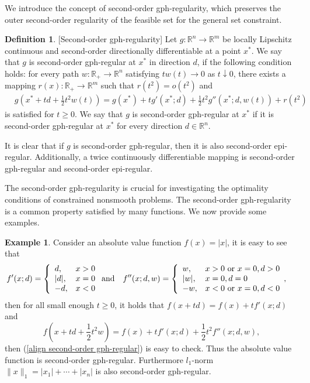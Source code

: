 \documentclass[11pt]{article}
\theoremstyle{definition}
\newtheorem{definition}[theorem]{Definition}
\newtheorem{example}[theorem]{Example}
\theoremstyle{remark}
\numberwithin{equation}{section}
\begin{document}
We introduce the concept of second-order gph-regularity, which preserves the outer second-order regularity of the feasible set for the general set constraint.
\begin{definition}\label{def Second-order gph-regular}[Second-order gph-regularity]
 Let $g:\mathbb{R}^n\to \mathbb{R}^m$ be locally Lipschitz continuous and second-order directionally differentiable at a point $x^*$.
   We say that $g$ is second-order gph-regular at $x^*$ in
  direction $d$, if the following condition holds: for
every path $w:\mathbb{R}_{+}\to \mathbb{R}^n$ satisfying $tw(t)\to 0$ as $t\downarrow 0$, there exists  a mapping $r(x):\mathbb{R}_{+}\to \mathbb{R}^m$ such that
$r(t^2)=o(t^2)$ and
\begin{align}\label{align second-order gph-regular}
  & g\left(x^*+td+\frac{1}{2}t^2w(t)\right)=g(x^*)+tg'(x^*;d)+\frac{1}{2}t^2g''(x^*;d,w(t))+r(t^2)
\end{align}
is satisfied for $t\ge 0$. We say that $g$ is second-order gph-regular at $x^*$
if it
is second-order gph-regular at $x^*$ for every direction $d\in\mathbb{R}^n$.
\end{definition}
It is clear that if $g$ is  second-order
gph-regular, then it is also second-order
epi-regular. Additionally, a twice continuously differentiable mapping  is  second-order
gph-regular and second-order
epi-regular.

The second-order gph-regularity is crucial for investigating the optimality conditions of constrained nonsmooth problems.
The second-order gph-regularity is a common property satisfied by many functions. We now provide some examples.
\begin{example}\label{abs}
  Consider an absolute value function $f(x)=|x|$, it is easy to see that
  \begin{align}%
     & f'(x;d)=\left\{\begin{array}{ll}
                                        d, &x>0  \\
                                         |d|,&x=0\\
                                        -d,&x<0
                                       \end{array}\right.\text{and}\quad
     f''(x;d,w)=\left\{\begin{array}{ll}
                                         w,&x>0 ~\text{or}~ x=0,d>0 \\
                                        |w|,&  x=0,d=0\\
                                         -w,& x<0 ~\text{or}~ x=0,d<0
                                       \end{array},\right.\notag
  \end{align}
   then for all small enough $t\ge0$, it holds that $f(x+td)=f(x)+tf'(x;d)$ and
$$
f(x+td+\frac{1}{2}t^2 w) =f(x)+tf'(x;d)
   +\frac{1}{2}t^2f''(x;d,w),
$$
then  (\ref{align second-order gph-regular}) is easy to check. Thus  the absolute value function
is  second-order gph-regular. Furthermore $l_1$-norm $\|x\|_1=|x_1|+\cdots+|x_n|$ is also second-order gph-regular.
\end{example}
\end{document}

